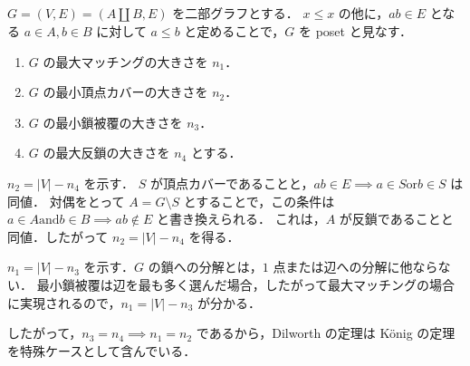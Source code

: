 \subsection{}
$G=(V, E) = (A\amalg B, E)$ を二部グラフとする．
$x\leq x$ の他に，$ab\in E$ となる $a\in A, b\in B$ に対して $a\leq b$ と定めることで，$G$ を poset と見なす．
\begin{enumerate}
 \item $G$ の最大マッチングの大きさを $n_1$．
 \item $G$ の最小頂点カバーの大きさを $n_2$．
 \item $G$ の最小鎖被覆の大きさを $n_3$．
 \item $G$ の最大反鎖の大きさを $n_4$ とする．
\end{enumerate}

$n_2 = |V| - n_4$ を示す．
$S$ が頂点カバーであることと，$ab\in E\implies a\in S \text{or} b\in S$ は同値．
対偶をとって $A = G\setminus S$ とすることで，この条件は
$a\in A \text{and} b\in B\implies ab\notin E$ と書き換えられる．
これは，$A$ が反鎖であることと同値．したがって $n_2 = |V| - n_4$ を得る．

$n_1 = |V| - n_3$ を示す．$G$ の鎖への分解とは，$1$ 点または辺への分解に他ならない．
最小鎖被覆は辺を最も多く選んだ場合，したがって最大マッチングの場合に実現されるので，$n_1 = |V| - n_3$ が分かる．

したがって，$n_3=n_4\implies n_1=n_2$ であるから，Dilworth の定理は K\"{o}nig の定理を特殊ケースとして含んでいる．